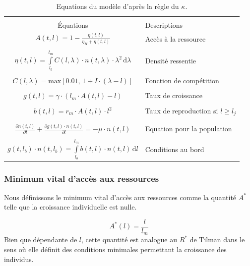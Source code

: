 \begin{table}
\centering
\caption{\label{tab:ANEq} Equations du modèle d'après la règle du $\kappa$.}
\begin{tabular}{cl}
\hline 
\hline
&\\
Équations & Descriptions \\
\hline
	$\displaystyle{A(t,l)=1-\frac{\eta(t,l)}{\eta_{H}+\eta(t,l)}}$ & Accès à la
	ressource\\
	&\\
	$\displaystyle{\eta (t,l) = \int\limits_{l_b}^{l_m} C(l,\lambda)\cdot
	n(t,\lambda)\cdot \lambda^2\,\text{d}\lambda}$ & Densité ressentie\\
	&\\
	$\displaystyle{C(l,\lambda) = \text{max}[0.01,\, 1+I\cdot(\lambda-l)]}$ &
	Fonction de compétition \\
	&\\
	$\displaystyle{g(t,l) = \gamma\cdot(l_m \cdot A(t,l)-l)}$ & Taux de
	croissance\\
	&\\
	$\displaystyle{b(t,l) = r_m \cdot A(t,l)\cdot l^2}$ & Taux de reproduction si
	$l\geq l_j$\\
	&\\
	&\\
	$\displaystyle{\frac{\partial n(t,l)}{\partial t}+ \frac{\partial
	g(t,l)\cdot n(t,l)}{\partial l} = -\mu \cdot n(t,l) }$ & Equation pour la
	population\\
	&\\
	$\displaystyle{g(t,l_b)\cdot n(t,l_b) = \int\limits_{l_b}^{l_m} b(t,l)\cdot
	n(t,l) \, \text{d}l}$ & Conditions au bord \\
\hline 
\end{tabular} 
\end{table}

\subsubsection{Minimum vital d'accès aux ressources}
Nous définissons le minimum vital d'accès aux ressources comme la quantité $A^*$
telle que la croissance individuelle est nulle.

\begin{equation}
\label{eq_an4}
A^*(l) = \frac{l}{l_m}
\end{equation}
Bien que dépendante de $l$,
cette quantité est analogue au $R^*$ de Tilman dans le sens où elle définit des
conditions minimales permettant la croissance des individus. 

